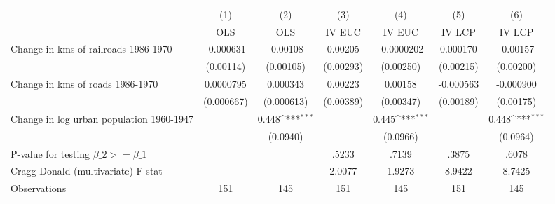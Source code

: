 {
\def\sym#1{\ifmmode^{#1}\else\(^{#1}\)\fi}
\begin{tabular}{l*{6}{c}}
\hline\hline
                &\multicolumn{1}{c}{(1)}&\multicolumn{1}{c}{(2)}&\multicolumn{1}{c}{(3)}&\multicolumn{1}{c}{(4)}&\multicolumn{1}{c}{(5)}&\multicolumn{1}{c}{(6)}\\
                &\multicolumn{1}{c}{OLS}&\multicolumn{1}{c}{OLS}&\multicolumn{1}{c}{IV EUC}&\multicolumn{1}{c}{IV EUC}&\multicolumn{1}{c}{IV LCP}&\multicolumn{1}{c}{IV LCP}\\
\hline
Change in kms of railroads 1986-1970&-0.000631         & -0.00108         &  0.00205         &-0.0000202         & 0.000170         & -0.00157         \\
                &(0.00114)         &(0.00105)         &(0.00293)         &(0.00250)         &(0.00215)         &(0.00200)         \\
[1em]
Change in kms of roads 1986-1970&0.0000795         & 0.000343         &  0.00223         &  0.00158         &-0.000563         &-0.000900         \\
                &(0.000667)         &(0.000613)         &(0.00389)         &(0.00347)         &(0.00189)         &(0.00175)         \\
[1em]
Change in log urban population 1960-1947&                  &    0.448\sym{***}&                  &    0.445\sym{***}&                  &    0.448\sym{***}\\
                &                  & (0.0940)         &                  & (0.0966)         &                  & (0.0964)         \\
\hline
P-value for testing $\beta\_{2} >= \beta\_{1}$&                  &                  &    .5233         &    .7139         &    .3875         &    .6078         \\
Cragg-Donald (multivariate) F-stat&                  &                  &   2.0077         &   1.9273         &   8.9422         &   8.7425         \\
Observations    &      151         &      145         &      151         &      145         &      151         &      145         \\
\hline\hline
\end{tabular}
}
